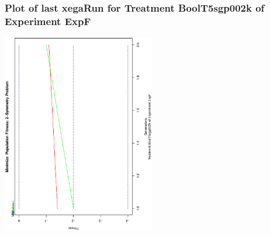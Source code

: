  \begin{frame}
 \frametitle{ Plot of last xegaRun for Treatment BoolT5sgp002k of Experiment ExpF }
 \begin{center}
\includegraphics[width=0.5\textwidth, angle=-90]
{ExpFPlotPopStatsFigure000.eps}
 \end{center}
 \label{templateReport/ExpFPlotPopStatsFigure000.eps}  
 \end{frame}

